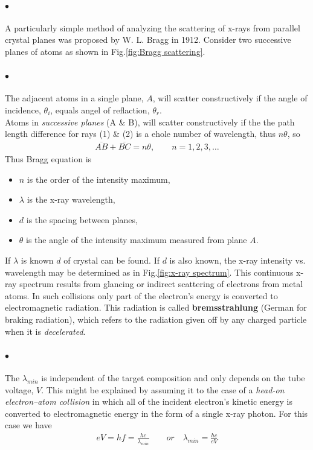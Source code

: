     \paragraph{$\bullet$} A particularly simple method of analyzing the scattering of x-rays from parallel 
    crystal planes was proposed by W. L. Bragg in 1912. Consider two successive planes of atoms 
    as shown in Fig.\eqref{fig:Bragg scattering}.

    \paragraph{$\bullet$} The adjacent atoms in a single plane, $A$, will scatter constructively if the angle of 
    incidence, $\theta_i$, equals angel of reflaction, $\theta_r$.\\
    Atoms in \textit{successive planes} (A \& B), will scatter constructively if the the path length difference for rays (1) \& (2)
    is a ehole number of wavelength, thus $n\theta$, so 
    \begin{align}
        \label{The condition of scattering}
        \overline{AB} + \overline{BC} = n\theta, \qquad n=1, 2, 3, \dots
    \end{align}
    Thus Bragg equation is 
    {\tiny \begin{itemize}
        \item $n$ is the order of the intensity maximum, 
        \item $\lambda$ is the x-ray wavelength, 
        \item $d$ is the spacing between planes, 
        \item $\theta$ is the angle of the intensity maximum measured from plane $A$.
    \end{itemize}}
    If $\lambda$ is known $d$ of crystal can be found. If $d$ is also known, the x-ray intensity vs. wavelength may be determined
    as in Fig.\eqref{fig:x-ray spectrum}. This continuous x-ray spectrum results from glancing or indirect scattering 
    of electrons from metal atoms. In such collisions only part of the electron’s energy is converted to electromagnetic radiation.
    This radiation is called \textbf{bremsstrahlung} (German for braking radiation), which refers to the 
    radiation given off by any charged particle when it is \textit{decelerated}.

    \paragraph{$\bullet$} The $\lambda_{min}$ is independent of the target composition and only depends on the tube voltage, $V$.
    This might be explained by assuming it to the case of a \textit{head-on electron–atom collision} in which all of the 
    incident electron’s kinetic energy is converted to electromagnetic energy in the form of a single x-ray photon. For this case we have
    \begin{align}
        \label{eq:electron energy into x-ray}
        eV = hf = \frac{hc}{\lambda_{min}} \qquad or \quad \lambda_{min} = \frac{hc}{eV}
    \end{align}

